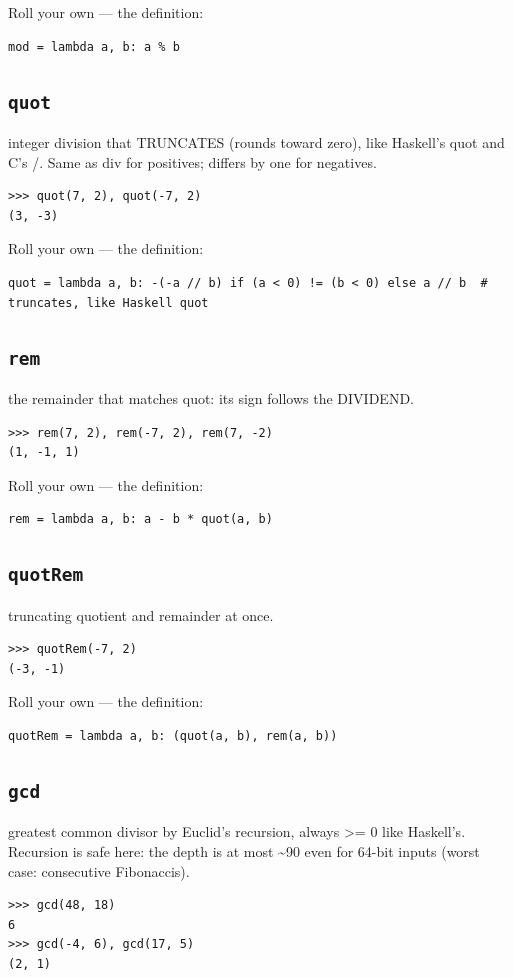 \documentclass[10pt,letterpaper]{book}
\begin{document}
Roll your own --- the definition:

\begin{lstlisting}[style=ex]
mod = lambda a, b: a % b
\end{lstlisting}
\subsection{\texttt{quot}}\label{def:quot}
integer division that TRUNCATES (rounds toward zero), like Haskell's quot and C's /. Same as div for positives; differs by one for negatives.
\begin{lstlisting}[style=ex]
>>> quot(7, 2), quot(-7, 2)
(3, -3)
\end{lstlisting}

Roll your own --- the definition:

\begin{lstlisting}[style=ex]
quot = lambda a, b: -(-a // b) if (a < 0) != (b < 0) else a // b  # truncates, like Haskell quot
\end{lstlisting}
\subsection{\texttt{rem}}\label{def:rem}
the remainder that matches quot: its sign follows the DIVIDEND.
\begin{lstlisting}[style=ex]
>>> rem(7, 2), rem(-7, 2), rem(7, -2)
(1, -1, 1)
\end{lstlisting}

Roll your own --- the definition:

\begin{lstlisting}[style=ex]
rem = lambda a, b: a - b * quot(a, b)
\end{lstlisting}
\subsection{\texttt{quotRem}}\label{def:quotRem}
truncating quotient and remainder at once.
\begin{lstlisting}[style=ex]
>>> quotRem(-7, 2)
(-3, -1)
\end{lstlisting}

Roll your own --- the definition:

\begin{lstlisting}[style=ex]
quotRem = lambda a, b: (quot(a, b), rem(a, b))
\end{lstlisting}
\subsection{\texttt{gcd}}\label{def:gcd}
greatest common divisor by Euclid's recursion, always >= 0 like Haskell's. Recursion is safe here: the depth is at most \~{}90 even for 64-bit inputs (worst case: consecutive Fibonaccis).
\begin{lstlisting}[style=ex]
>>> gcd(48, 18)
6
>>> gcd(-4, 6), gcd(17, 5)
(2, 1)
\end{lstlisting}
\end{document}
